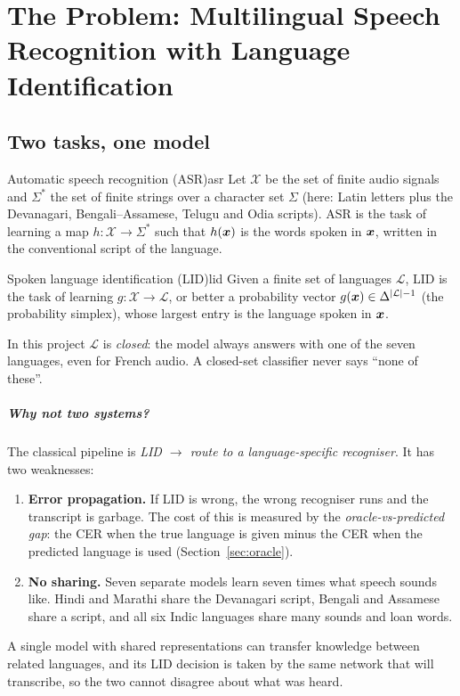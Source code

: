 \chapter{The Problem: Multilingual Speech Recognition with Language Identification}

\section{Two tasks, one model}

\begin{definition}{Automatic speech recognition (ASR)}{asr}
Let $\mathcal X$ be the set of finite audio signals and $\Sigma^*$ the set of finite strings over a character set $\Sigma$
(here: Latin letters plus the Devanagari, Bengali--Assamese, Telugu and Odia scripts). ASR is the task of learning a map
$h:\mathcal X\to\Sigma^*$ such that $h(\bm{x})$ is the words spoken in $\bm{x}$, written in the conventional script of the language.
\end{definition}

\begin{definition}{Spoken language identification (LID)}{lid}
Given a finite set of languages $\mathcal L$, LID is the task of learning $g:\mathcal X\to\mathcal L$, or better a probability
vector $g(\bm{x})\in\Delta^{|\mathcal L|-1}$ (the probability simplex), whose largest entry is the language spoken in $\bm{x}$.
\end{definition}

In this project $\mathcal L$ is \emph{closed}: the model always answers with one of the seven languages, even for French audio. A
closed-set classifier never says ``none of these''.

\paragraph{Why not two systems?} The classical pipeline is \emph{LID $\to$ route to a language-specific recogniser}. It has two
weaknesses:
\begin{enumerate}
\item \textbf{Error propagation.} If LID is wrong, the wrong recogniser runs and the transcript is garbage. The cost of this is
measured by the \emph{oracle-vs-predicted gap}: the CER when the true language is given minus the CER when the predicted language
is used (Section~\ref{sec:oracle}).
\item \textbf{No sharing.} Seven separate models learn seven times what speech sounds like. Hindi and Marathi share the Devanagari
script, Bengali and Assamese share a script, and all six Indic languages share many sounds and loan words.
\end{enumerate}
A single model with shared representations can transfer knowledge between related languages, and its LID decision is
taken by the same network that will transcribe, so the two cannot disagree about what was heard.

